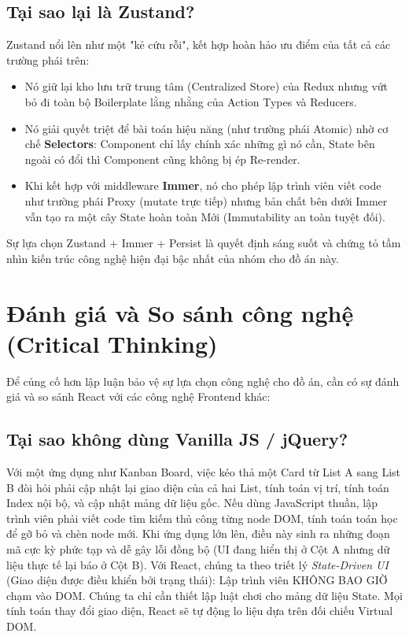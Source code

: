 \subsection{Tại sao lại là Zustand?}
Zustand nổi lên như một "kẻ cứu rỗi", kết hợp hoàn hảo ưu điểm của tất cả các trường phái trên:
\begin{itemize}
    \item Nó giữ lại kho lưu trữ trung tâm (Centralized Store) của Redux nhưng vứt bỏ đi toàn bộ Boilerplate lằng nhằng của Action Types và Reducers.
    \item Nó giải quyết triệt để bài toán hiệu năng (như trường phái Atomic) nhờ cơ chế \textbf{Selectors}: Component chỉ lấy chính xác những gì nó cần, State bên ngoài có đổi thì Component cũng không bị ép Re-render.
    \item Khi kết hợp với middleware \textbf{Immer}, nó cho phép lập trình viên viết code như trường phái Proxy (mutate trực tiếp) nhưng bản chất bên dưới Immer vẫn tạo ra một cây State hoàn toàn Mới (Immutability an toàn tuyệt đối).
\end{itemize}
Sự lựa chọn Zustand + Immer + Persist là quyết định sáng suốt và chứng tỏ tầm nhìn kiến trúc công nghệ hiện đại bậc nhất của nhóm cho đồ án này.

\section{Đánh giá và So sánh công nghệ (Critical Thinking)}
Để củng cố hơn lập luận bảo vệ sự lựa chọn công nghệ cho đồ án, cần có sự đánh giá và so sánh React với các công nghệ Frontend khác:

\subsection{Tại sao không dùng Vanilla JS / jQuery?}
Với một ứng dụng như Kanban Board, việc kéo thả một Card từ List A sang List B đòi hỏi phải cập nhật lại giao diện của cả hai List, tính toán vị trí, tính toán Index nội bộ, và cập nhật mảng dữ liệu gốc. Nếu dùng JavaScript thuần, lập trình viên phải viết code tìm kiếm thủ công từng node DOM, tính toán toán học để gỡ bỏ và chèn node mới. Khi ứng dụng lớn lên, điều này sinh ra những đoạn mã cực kỳ phức tạp và dễ gây lỗi đồng bộ (UI đang hiển thị ở Cột A nhưng dữ liệu thực tế lại báo ở Cột B).
Với React, chúng ta theo triết lý \textit{State-Driven UI} (Giao diện được điều khiển bởi trạng thái): Lập trình viên KHÔNG BAO GIỜ chạm vào DOM. Chúng ta chỉ cần thiết lập luật chơi cho mảng dữ liệu State. Mọi tính toán thay đổi giao diện, React sẽ tự động lo liệu dựa trên đối chiếu Virtual DOM.

